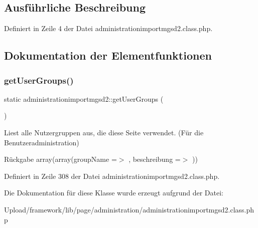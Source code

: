 \subsection{Ausführliche Beschreibung}


Definiert in Zeile 4 der Datei administrationimportmgsd2.\+class.\+php.



\subsection{Dokumentation der Elementfunktionen}
\mbox{\label{classadministrationimportmgsd2_a0410fdb7c1b6300363740da6457389b9}} 
\subsubsection{\texorpdfstring{get\+User\+Groups()}{getUserGroups()}}
{\footnotesize\ttfamily static administrationimportmgsd2\+::get\+User\+Groups (\begin{DoxyParamCaption}{ }\end{DoxyParamCaption})\hspace{0.3cm}{\ttfamily [static]}}

Liest alle Nutzergruppen aus, die diese Seite verwendet. (Für die Benutzeradministration) \begin{DoxyReturn}{Rückgabe}
array(array(\textquotesingle{}group\+Name\textquotesingle{} =$>$ \textquotesingle{}\textquotesingle{}, \textquotesingle{}beschreibung\textquotesingle{} =$>$ \textquotesingle{}\textquotesingle{})) 
\end{DoxyReturn}


Definiert in Zeile 308 der Datei administrationimportmgsd2.\+class.\+php.



Die Dokumentation für diese Klasse wurde erzeugt aufgrund der Datei\+:\begin{DoxyCompactItemize}
\item 
Upload/framework/lib/page/administration/administrationimportmgsd2.\+class.\+php\end{DoxyCompactItemize}
